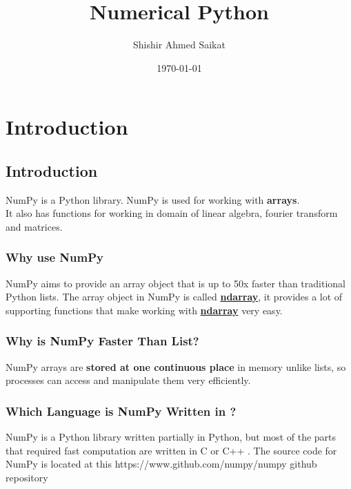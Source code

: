 \documentclass[openany]{book}
\title{Numerical Python}
\author{Shishir Ahmed Saikat}
\date{\today}
\begin{document}
\frontmatter %

\maketitle{}
\tableofcontents

\mainmatter %


\chapter{Introduction}
\section{Introduction}
NumPy is a Python library.
NumPy is used for working with \textbf{arrays}. \\
It also has functions for working in domain of linear algebra, fourier transform and matrices.\\


\subsection{Why use NumPy}
NumPy aims to provide an array object that is up to 50x faster than traditional Python lists. The array object in NumPy is called \textbf{\underline{ndarray}}, it provides a lot of supporting functions that make working with \textbf{\underline{ndarray}} very easy. 

\subsection{Why is NumPy Faster Than List?}

NumPy arrays are \textbf{stored at one continuous place} in memory unlike lists, so processes can access and manipulate them very efficiently.

\subsection{Which Language is NumPy Written in ?}

NumPy is a Python library written partially in Python, but most of the parts that required fast computation are written in C or C++ . The source code for NumPy is located at this {https://www.github.com/numpy/numpy} github repository
\end{document}
